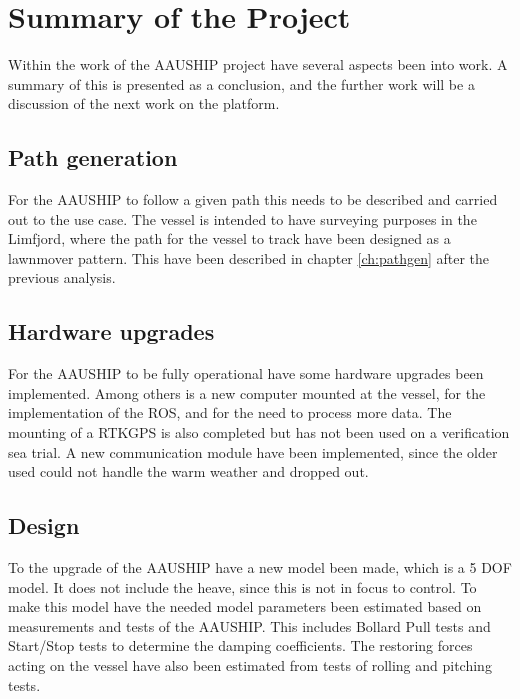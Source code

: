 \label{sc:FW}

\section{Summary of the Project}
Within the work of the AAUSHIP project have several aspects been into work. A summary of this is presented as a conclusion, and the further work will be a discussion of the next work on the platform.

\subsection{Path generation}
For the AAUSHIP to follow a given path this needs to be described and carried out to the use case. The vessel is intended to have surveying purposes in the Limfjord, where the path for the vessel to track have been designed as a lawnmover pattern. This have been described in chapter \ref{ch:pathgen} after the previous analysis.

\subsection{Hardware upgrades}
For the AAUSHIP to be fully operational have some hardware upgrades been implemented. Among others is a new computer mounted at the vessel, for the implementation of the \ac{ROS}, and for the need to process more data. The mounting of a \ac{RTK}\ac{GPS} is also completed but has not been used on a verification sea trial. A new communication module have been implemented, since the older used could not handle the warm weather and dropped out.

\subsection{Design}
To the upgrade of the AAUSHIP have a new model been made, which is a 5 \ac{DOF} model. It does not include the heave, since this is not in focus to control. To make this model have the needed model parameters been estimated based on measurements and tests of the AAUSHIP. This includes Bollard Pull tests and Start/Stop tests to determine the damping coefficients. The restoring forces acting on the vessel have also been estimated from tests of rolling and pitching tests.

